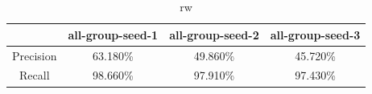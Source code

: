 \documentclass[runningheads,a4paper]{llncs}
\begin{document}
\section{}









\begin{table}
\centering
\begin{tabular}{|c|c|c|c|}
\hline
& all-group-seed-1&all-group-seed-2&all-group-seed-3 \\
\hline
Precision&63.180\% &49.860\% &45.720\% \\
\hline
Recall&98.660\% &97.910\% &97.430\%  \\
\hline
\end{tabular}
\caption{rw}
\end{table} 









\end{document}
